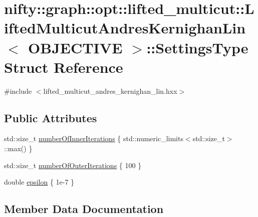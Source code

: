 \hypertarget{structnifty_1_1graph_1_1opt_1_1lifted__multicut_1_1LiftedMulticutAndresKernighanLin_1_1SettingsType}{}\section{nifty\+:\+:graph\+:\+:opt\+:\+:lifted\+\_\+multicut\+:\+:Lifted\+Multicut\+Andres\+Kernighan\+Lin$<$ O\+B\+J\+E\+C\+T\+I\+VE $>$\+:\+:Settings\+Type Struct Reference}
\label{structnifty_1_1graph_1_1opt_1_1lifted__multicut_1_1LiftedMulticutAndresKernighanLin_1_1SettingsType}


{\ttfamily \#include $<$lifted\+\_\+multicut\+\_\+andres\+\_\+kernighan\+\_\+lin.\+hxx$>$}

\subsection*{Public Attributes}
\begin{DoxyCompactItemize}
\item 
std\+::size\+\_\+t \hyperlink{structnifty_1_1graph_1_1opt_1_1lifted__multicut_1_1LiftedMulticutAndresKernighanLin_1_1SettingsType_a865f660cc26350e4e42372d923526b5d}{number\+Of\+Inner\+Iterations} \{ std\+::numeric\+\_\+limits$<$std\+::size\+\_\+t$>$\+::max() \}
\item 
std\+::size\+\_\+t \hyperlink{structnifty_1_1graph_1_1opt_1_1lifted__multicut_1_1LiftedMulticutAndresKernighanLin_1_1SettingsType_aeef8ae94794ac12f4d4d20805de5d1a6}{number\+Of\+Outer\+Iterations} \{ 100 \}
\item 
double \hyperlink{structnifty_1_1graph_1_1opt_1_1lifted__multicut_1_1LiftedMulticutAndresKernighanLin_1_1SettingsType_adada285b7910779da85670e6d674abba}{epsilon} \{ 1e-\/7 \}
\end{DoxyCompactItemize}


\subsection{Member Data Documentation}
\mbox{\label{structnifty_1_1graph_1_1opt_1_1lifted__multicut_1_1LiftedMulticutAndresKernighanLin_1_1SettingsType_adada285b7910779da85670e6d674abba}} 
